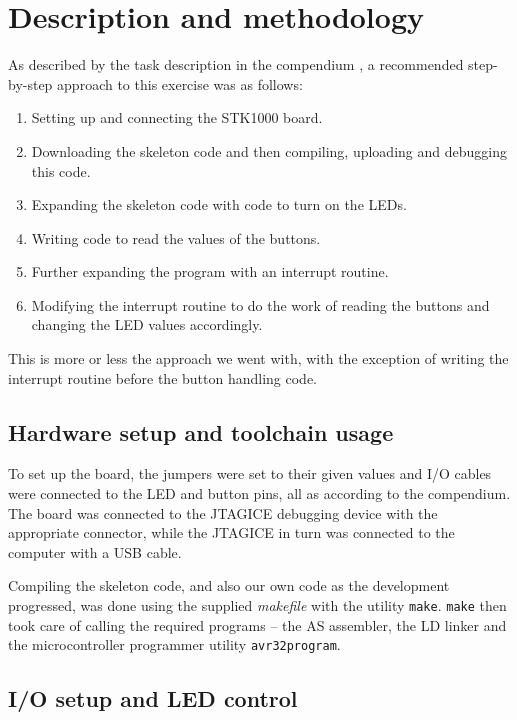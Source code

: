 \section{Description and methodology}

As described by the task description in the compendium \cite{comp}, a
recommended step-by-step approach to this exercise was as follows:

\begin{enumerate}
    \item Setting up and connecting the STK1000 board.
    \item Downloading the skeleton code and then compiling, uploading
    and debugging this code.
    \item Expanding the skeleton code with code to turn on the LEDs.
    \item Writing code to read the values of the buttons.
    \item Further expanding the program with an interrupt routine.
    \item Modifying the interrupt routine to do the work of reading the
    buttons and changing the LED values accordingly.
\end{enumerate}

This is more or less the approach we went with, with the exception of
writing the interrupt routine before the button handling code.

\subsection{Hardware setup and toolchain usage}

To set up the board, the jumpers were set to their given values and I/O
cables were connected to the LED and button pins, all as according to
the compendium. The board was connected to the JTAGICE debugging device
with the appropriate connector, while the JTAGICE in turn was connected
to the computer with a USB cable.

Compiling the skeleton code, and also our own code as the development
progressed, was done using the supplied \emph{makefile} with the
utility \texttt{make}. \texttt{make} then took care of calling the
required programs -- the AS assembler, the LD linker and the
microcontroller programmer utility \texttt{avr32program}.

\subsection{I/O setup and LED control}

